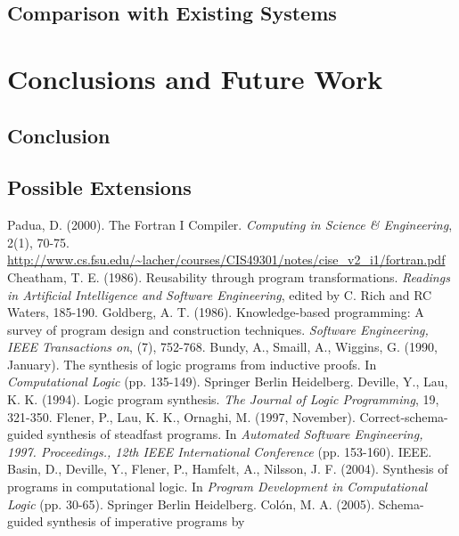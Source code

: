 \documentclass[a4paper,twoside,notitlepage]{report}
\begin{document}
\section{Comparison with Existing Systems}

\chapter{Conclusions and Future Work}
\section{Conclusion}
\section{Possible Extensions}

\begin{thebibliography}{9}
        Padua, D. (2000). The Fortran I Compiler.
        \emph{Computing in Science \& Engineering}, 2(1), 70-75.
        \url{http://www.cs.fsu.edu/~lacher/courses/CIS49301/notes/cise_v2_i1/fortran.pdf}
        Cheatham, T. E. (1986). Reusability through program transformations. 
        \emph{Readings in Artificial Intelligence and Software Engineering}, 
        edited by C. Rich and RC Waters, 185-190.
        Goldberg, A. T. (1986). Knowledge-based programming:
        A survey of program design and construction techniques.
        \emph{Software Engineering, IEEE Transactions on}, (7), 752-768.
        Bundy, A., Smaill, A., Wiggins, G. (1990, January).
        The synthesis of logic programs from inductive proofs.
        In \emph{Computational Logic} (pp. 135-149). Springer Berlin Heidelberg.
        Deville, Y., Lau, K. K. (1994). Logic program synthesis.
        \emph{The Journal of Logic Programming}, 19, 321-350.
        Flener, P., Lau, K. K., Ornaghi, M. (1997, November). 
        Correct-schema-guided synthesis of steadfast programs.
        In \emph{Automated Software Engineering, 1997.
        Proceedings., 12th IEEE International Conference} (pp. 153-160). IEEE.
        Basin, D., Deville, Y., Flener, P., Hamfelt, A., Nilsson, J. F. (2004).
        Synthesis of programs in computational logic.
        In \emph{Program Development in Computational Logic} (pp. 30-65).
        Springer Berlin Heidelberg.
        Colón, M. A. (2005). Schema-guided synthesis of imperative programs by 

\end{thebibliography}
\end{document}
